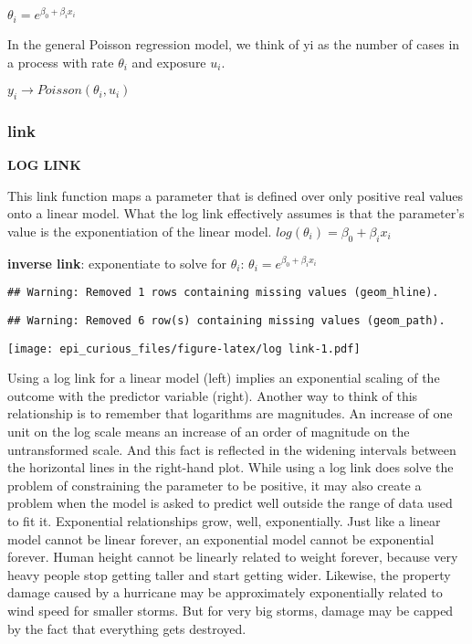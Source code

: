 \documentclass[
]{article}
\begin{document}
\(\theta_i=e^{\beta_0 +\beta_ix_i}\)

In the general Poisson regression model, we think of yi as the number of
cases in a process with rate \(\theta_i\) and exposure \(u_i\).

\(y_i \to Poisson(\theta_i, u_i)\)

\hypertarget{link-2}{%
\subsubsection{link}\label{link-2}}

\textbf{LOG LINK}

This link function maps a parameter that is defined over only positive
real values onto a linear model. What the log link effectively assumes
is that the parameter's value is the exponentiation of the linear model.
\(log(\theta_i)= \beta_0 +\beta_ix_i\)

\textbf{inverse link}: exponentiate to solve for \(\theta_i\):
\(\theta_i=e^{\beta_0 +\beta_ix_i}\)

\begin{verbatim}
## Warning: Removed 1 rows containing missing values (geom_hline).
\end{verbatim}

\begin{verbatim}
## Warning: Removed 6 row(s) containing missing values (geom_path).
\end{verbatim}

\texttt{[image: epi\_curious\_files/figure-latex/log link-1.pdf]}

Using a log link for a linear model (left) implies an exponential
scaling of the outcome with the predictor variable (right). Another way
to think of this relationship is to remember that logarithms are
magnitudes. An increase of one unit on the log scale means an increase
of an order of magnitude on the untransformed scale. And this fact is
reflected in the widening intervals between the horizontal lines in the
right-hand plot. While using a log link does solve the problem of
constraining the parameter to be positive, it may also create a problem
when the model is asked to predict well outside the range of data used
to fit it. Exponential relationships grow, well, exponentially. Just
like a linear model cannot be linear forever, an exponential model
cannot be exponential forever. Human height cannot be linearly related
to weight forever, because very heavy people stop getting taller and
start getting wider. Likewise, the property damage caused by a hurricane
may be approximately exponentially related to wind speed for smaller
storms. But for very big storms, damage may be capped by the fact that
everything gets destroyed.
\end{document}
